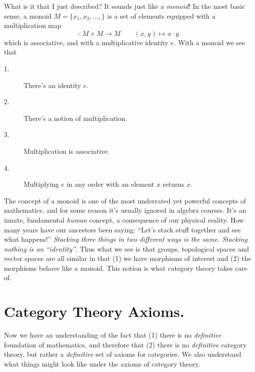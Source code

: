     What is it that I just described? It sounds just like 
    a \emph{monoid}! In the most 
    basic sense, a monoid $M = \{x_1, x_2, \dots, \}$ is a set of elements equipped with 
    a multiplication map 
    \[
        \cdot: M \times M \to M \qquad (x, y) \mapsto x\cdot y
    \]
    which is associative, and with a multiplicative identity $e$. With a monoid we see that 
    \begin{description}
        \item[1.] There's an identity $e$.
        \item[2.] There's a notion of multiplication.
        \item[3.] Multiplication is associative.
        \item[4.] Multiplying $e$ in any order with an element $x$ returns $x$.     
    \end{description}    
    The concept 
    of a monoid is one of the most underrated yet powerful concepts of mathematics, 
    and for some reason it's usually ignored in algebra courses. It's an
    innate, fundamental \emph{human} concept, a consequence of our physical 
    reality. How many years have our ancestors been saying: ``Let's stack stuff together and see what 
    happens!'' \emph{Stacking three things in two different ways is the same. 
    Stacking nothing is an ``identity''}. Thus what we see is that groups, topological 
    spaces and vector spaces are all similar in that (1) we have morphisms of interest 
    and (2) the morphisms behave like a monoid. This notion 
    is what category theory takes care of.

    \newpage
    \section{Category Theory Axioms.}   
    Now we have an understanding of the fact that (1) there is no
    \textit{definitive} foundation of mathematics, and therefore that
    (2) there is no
    \textit{definitive} category theory, but rather a
    \textit{definitive} set of axioms for categories. We also
    understand what things might look like under the axioms of
    category theory. 

